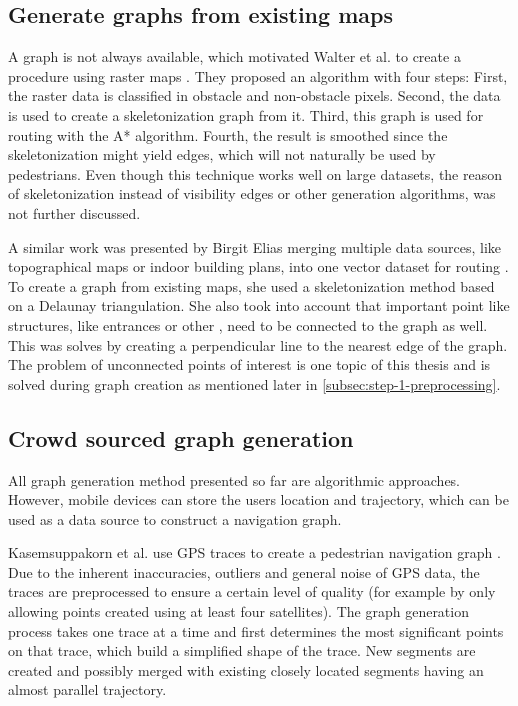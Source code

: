	\subsection{Generate graphs from existing maps}
	\label{subsection:generate-graphs-from-maps}
	
		A graph is not always available, which motivated Walter et al. to create a procedure using raster maps \cite{walter-raster-maps}.
		They proposed an algorithm with four steps:
		First, the raster data is classified in obstacle and non-obstacle pixels.
		Second, the data is used to create a skeletonization graph from it.
		Third, this graph is used for routing with the A* algorithm.
		Fourth, the result is smoothed since the skeletonization might yield edges, which will not naturally be used by pedestrians.
		Even though this technique works well on large datasets, the reason of skeletonization instead of visibility edges or other generation algorithms, was not further discussed.
		
		A similar work was presented by Birgit Elias merging multiple data sources, like topographical maps or indoor building plans, into one vector dataset for routing \cite{elias-tailored-geodatabase}.
		To create a graph from existing maps, she used a skeletonization method based on a Delaunay triangulation.
		She also took into account that important point like structures, like entrances or other , need to be connected to the graph as well.
		This was solves by creating a perpendicular line to the nearest edge of the graph.
		The problem of unconnected points of interest is one topic of this thesis and is solved during graph creation as mentioned later in \cref{subsec:step-1-preprocessing}.
		
	\subsection{Crowd sourced graph generation}
	
		All graph generation method presented so far are algorithmic approaches.
		However, mobile devices can store the users location and trajectory, which can be used as a data source to construct a navigation graph.
		
		Kasemsuppakorn et al. use GPS traces to create a pedestrian navigation graph \cite{kasemsuppakorn-gps-traces-pedestrain-network}.
		Due to the inherent inaccuracies, outliers and general noise of GPS data, the traces are preprocessed to ensure a certain level of quality (for example by only allowing points created using at least four satellites).
		The graph generation process takes one trace at a time and first determines the most significant points on that trace, which build a simplified shape of the trace.
		New segments are created and possibly merged with existing closely located segments having an almost parallel trajectory.
		
